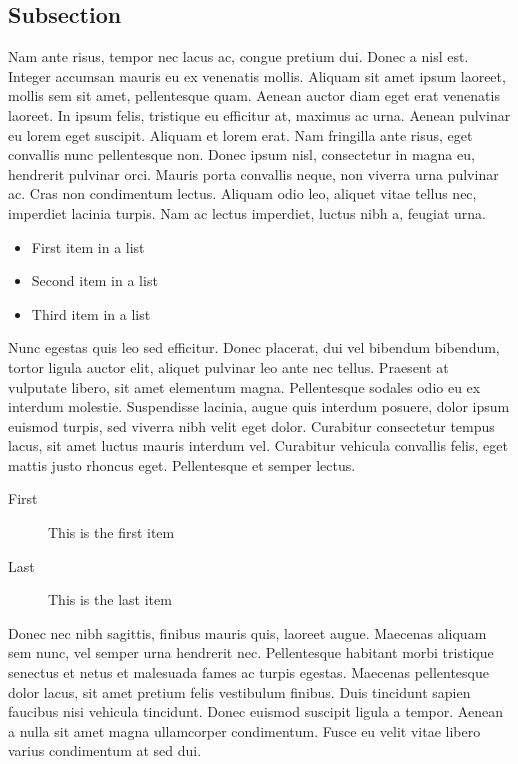 \documentclass[10pt, a4paper, twocolumn]{article} %
\begin{document}
\subsection{Subsection}

Nam ante risus, tempor nec lacus ac, congue pretium dui. Donec a nisl est. Integer accumsan mauris eu ex venenatis mollis. Aliquam sit amet ipsum laoreet, mollis sem sit amet, pellentesque quam. Aenean auctor diam eget erat venenatis laoreet. In ipsum felis, tristique eu efficitur at, maximus ac urna. Aenean pulvinar eu lorem eget suscipit. Aliquam et lorem erat. Nam fringilla ante risus, eget convallis nunc pellentesque non. Donec ipsum nisl, consectetur in magna eu, hendrerit pulvinar orci. Mauris porta convallis neque, non viverra urna pulvinar ac. Cras non condimentum lectus. Aliquam odio leo, aliquet vitae tellus nec, imperdiet lacinia turpis. Nam ac lectus imperdiet, luctus nibh a, feugiat urna.

\begin{itemize}
	\item First item in a list 
	\item Second item in a list 
	\item Third item in a list
\end{itemize}

Nunc egestas quis leo sed efficitur. Donec placerat, dui vel bibendum bibendum, tortor ligula auctor elit, aliquet pulvinar leo ante nec tellus. Praesent at vulputate libero, sit amet elementum magna. Pellentesque sodales odio eu ex interdum molestie. Suspendisse lacinia, augue quis interdum posuere, dolor ipsum euismod turpis, sed viverra nibh velit eget dolor. Curabitur consectetur tempus lacus, sit amet luctus mauris interdum vel. Curabitur vehicula convallis felis, eget mattis justo rhoncus eget. Pellentesque et semper lectus.

\begin{description}
	\item[First] This is the first item
	\item[Last] This is the last item
\end{description}

Donec nec nibh sagittis, finibus mauris quis, laoreet augue. Maecenas aliquam sem nunc, vel semper urna hendrerit nec. Pellentesque habitant morbi tristique senectus et netus et malesuada fames ac turpis egestas. Maecenas pellentesque dolor lacus, sit amet pretium felis vestibulum finibus. Duis tincidunt sapien faucibus nisi vehicula tincidunt. Donec euismod suscipit ligula a tempor. Aenean a nulla sit amet magna ullamcorper condimentum. Fusce eu velit vitae libero varius condimentum at sed dui.
\end{document}
